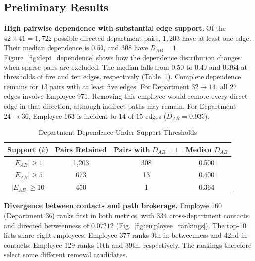 \documentclass[conference]{IEEEtran}
\begin{document}
\subsection{Preliminary Results}

\textbf{High pairwise dependence with substantial edge support.}
Of the $42\times41=1,722$ possible directed department pairs, $1,203$ have at least one edge. Their median dependence is $0.50$, and $308$ have $D_{AB}=1$. Figure~\ref{fig:dept_dependence} shows how the dependence distribution changes when sparse pairs are excluded. The median falls from $0.50$ to $0.40$ and $0.364$ at thresholds of five and ten edges, respectively (Table~\ref{tab:dependence_thresholds}). Complete dependence remains for $13$ pairs with at least five edges. For Department $32\to14$, all $27$ edges involve Employee 971. Removing this employee would remove every direct edge in that direction, although indirect paths may remain. For Department $24\to36$, Employee 163 is incident to $14$ of $15$ edges ($D_{AB}=0.933$).

\begin{table}[htbp]
\caption{Department Dependence Under Support Thresholds}
\begin{center}
\footnotesize
\setlength{\tabcolsep}{3.5pt}
\begin{tabular}{cccc}
\toprule
\textbf{Support ($k$)} & \textbf{Pairs Retained} & \textbf{Pairs with $D_{AB}=1$} & \textbf{Median $D_{AB}$} \\
\midrule
$|E_{AB}| \ge 1$  & 1,203 & 308 & 0.500 \\
$|E_{AB}| \ge 5$  & 673   & 13  & 0.400 \\
$|E_{AB}| \ge 10$ & 450   & 1   & 0.364 \\
\bottomrule
\end{tabular}
\label{tab:dependence_thresholds}
\end{center}
\end{table}

\textbf{Divergence between contacts and path brokerage.}
Employee 160 (Department 36) ranks first in both metrics, with $334$ cross-department contacts and directed betweenness of $0.07212$ (Fig.~\ref{fig:employee_rankings}). The top-10 lists share eight employees. Employee 377 ranks 9th in betweenness and 42nd in contacts; Employee 129 ranks 10th and 39th, respectively. The rankings therefore select some different removal candidates.
\end{document}

